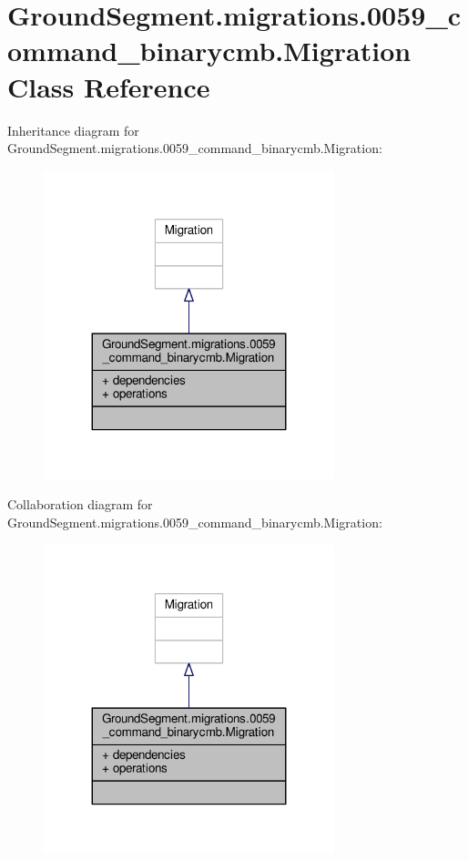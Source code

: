 \hypertarget{class_ground_segment_1_1migrations_1_10059__command__binarycmb_1_1_migration}{}\section{Ground\+Segment.\+migrations.0059\+\_\+command\+\_\+binarycmb.Migration Class Reference}
\label{class_ground_segment_1_1migrations_1_10059__command__binarycmb_1_1_migration}


Inheritance diagram for Ground\+Segment.\+migrations.0059\+\_\+command\+\_\+binarycmb.Migration\+:\nopagebreak
\begin{figure}[H]
\begin{center}
\leavevmode
\includegraphics[width=239pt]{class_ground_segment_1_1migrations_1_10059__command__binarycmb_1_1_migration__inherit__graph}
\end{center}
\end{figure}


Collaboration diagram for Ground\+Segment.\+migrations.0059\+\_\+command\+\_\+binarycmb.Migration\+:\nopagebreak
\begin{figure}[H]
\begin{center}
\leavevmode
\includegraphics[width=239pt]{class_ground_segment_1_1migrations_1_10059__command__binarycmb_1_1_migration__coll__graph}
\end{center}
\end{figure}
